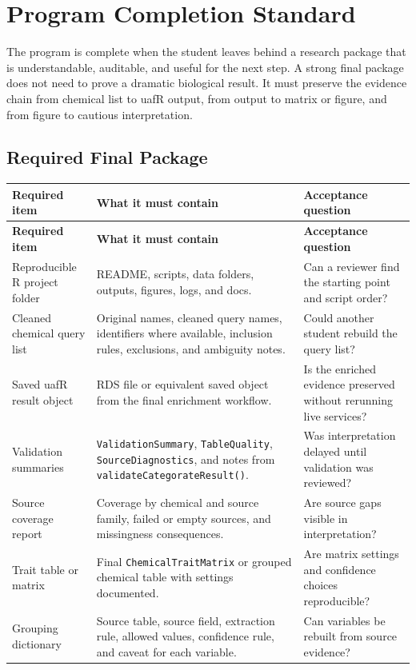 \chapter{Program Completion Standard}

The program is complete when the student leaves behind a research package that is understandable, auditable, and useful for the next step. A strong final package does not need to prove a dramatic biological result. It must preserve the evidence chain from chemical list to uafR output, from output to matrix or figure, and from figure to cautious interpretation.

\section{Required Final Package}
\begin{longtable}{p{}p{}p{}}
\toprule
\textbf{Required item} & \textbf{What it must contain} & \textbf{Acceptance question}\\
\midrule
\endfirsthead
\toprule
\textbf{Required item} & \textbf{What it must contain} & \textbf{Acceptance question}\\
\midrule
\endhead
Reproducible R project folder & README, scripts, data folders, outputs, figures, logs, and docs. & Can a reviewer find the starting point and script order?\\
Cleaned chemical query list & Original names, cleaned query names, identifiers where available, inclusion rules, exclusions, and ambiguity notes. & Could another student rebuild the query list?\\
Saved uafR result object & RDS file or equivalent saved object from the final enrichment workflow. & Is the enriched evidence preserved without rerunning live services?\\
Validation summaries & \texttt{ValidationSummary}, \texttt{TableQuality}, \texttt{SourceDiagnostics}, and notes from \texttt{validateCategorateResult()}. & Was interpretation delayed until validation was reviewed?\\
Source coverage report & Coverage by chemical and source family, failed or empty sources, and missingness consequences. & Are source gaps visible in interpretation?\\
Trait table or matrix & Final \texttt{ChemicalTraitMatrix} or grouped chemical table with settings documented. & Are matrix settings and confidence choices reproducible?\\
Grouping dictionary & Source table, source field, extraction rule, allowed values, confidence rule, and caveat for each variable. & Can variables be rebuilt from source evidence?\\

\end{longtable}
